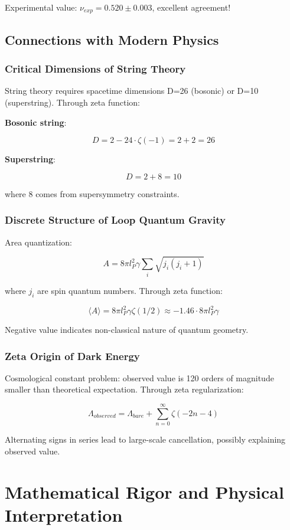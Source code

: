 \documentclass[12pt,a4paper]{article}
\begin{document}
Experimental value: $\nu_{exp} = 0.520 \pm 0.003$, excellent agreement!

\subsection{Connections with Modern Physics}

\subsubsection{Critical Dimensions of String Theory}

String theory requires spacetime dimensions D=26 (bosonic) or D=10 (superstring). Through zeta function:

\textbf{Bosonic string}:

$$D = 2 - 24 \cdot \zeta(-1) = 2 + 2 = 26$$

\textbf{Superstring}:

$$D = 2 + 8 = 10$$

where 8 comes from supersymmetry constraints.

\subsubsection{Discrete Structure of Loop Quantum Gravity}

Area quantization:

$$A = 8\pi l_P^2 \gamma \sum_i \sqrt{j_i(j_i+1)}$$

where $j_i$ are spin quantum numbers. Through zeta function:

$$\langle A \rangle = 8\pi l_P^2 \gamma \zeta(1/2) \approx -1.46 \cdot 8\pi l_P^2 \gamma$$

Negative value indicates non-classical nature of quantum geometry.

\subsubsection{Zeta Origin of Dark Energy}

Cosmological constant problem: observed value is 120 orders of magnitude smaller than theoretical expectation. Through zeta regularization:

$$\Lambda_{observed} = \Lambda_{bare} + \sum_{n=0}^{\infty} \zeta(-2n-4)$$

Alternating signs in series lead to large-scale cancellation, possibly explaining observed value.

\section{Mathematical Rigor and Physical Interpretation}
\end{document}
